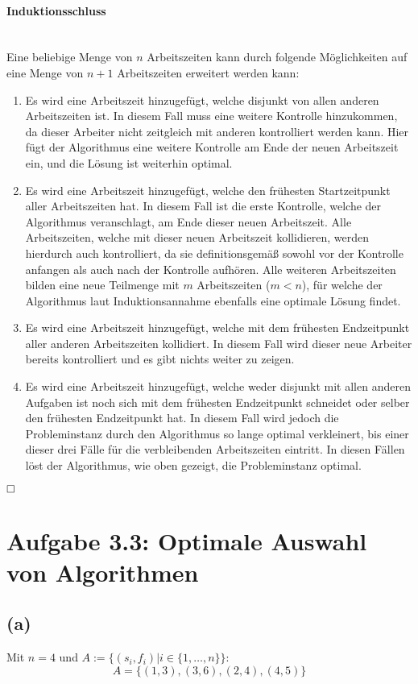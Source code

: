 \documentclass[a4paper,12pt]{article}
\begin{document}
\paragraph*{Induktionsschluss} \mbox{}\\
Eine beliebige Menge von $n$ Arbeitszeiten kann durch folgende Möglichkeiten auf eine Menge von $n+1$ Arbeitszeiten erweitert werden kann: 
\begin{enumerate}
\item Es wird eine Arbeitszeit hinzugefügt, welche disjunkt von allen anderen Arbeitszeiten ist. In diesem Fall muss eine weitere Kontrolle hinzukommen, da dieser Arbeiter nicht zeitgleich mit anderen kontrolliert werden kann. Hier fügt der Algorithmus eine weitere Kontrolle am Ende der neuen Arbeitszeit ein, und die Lösung ist weiterhin optimal.
\item Es wird eine Arbeitszeit hinzugefügt, welche den frühesten Startzeitpunkt aller Arbeitszeiten hat. In diesem Fall ist die erste Kontrolle, welche der Algorithmus veranschlagt, am Ende dieser neuen Arbeitszeit. Alle Arbeitszeiten, welche mit dieser neuen Arbeitszeit kollidieren, werden hierdurch auch kontrolliert, da sie definitionsgemäß sowohl vor der Kontrolle anfangen als auch nach der Kontrolle aufhören. Alle weiteren Arbeitszeiten bilden eine neue Teilmenge mit $m$ Arbeitszeiten ($m<n$), für welche der Algorithmus laut Induktionsannahme ebenfalls eine optimale Lösung findet.
\item Es wird eine Arbeitszeit hinzugefügt, welche mit dem frühesten Endzeitpunkt aller anderen Arbeitszeiten kollidiert. In diesem Fall wird dieser neue Arbeiter bereits kontrolliert und es gibt nichts weiter zu zeigen.
\item Es wird eine Arbeitszeit hinzugefügt, welche weder disjunkt mit allen anderen Aufgaben ist noch sich mit dem frühesten Endzeitpunkt schneidet oder selber den frühesten Endzeitpunkt hat. In diesem Fall wird jedoch die Probleminstanz durch den Algorithmus so lange optimal verkleinert, bis einer dieser drei Fälle für die verbleibenden Arbeitszeiten eintritt. In diesen Fällen löst der Algorithmus, wie oben gezeigt, die Probleminstanz optimal.
\end{enumerate}
$\hfill\square$

\pagebreak
\section*{Aufgabe 3.3: Optimale Auswahl von Algorithmen}
\subsection*{(a)}
Mit $n=4$ und $A:=\{(s_i,f_i)|i\in\{1,\ldots,n\}\}$:
$$A=\{(1,3),(3,6),(2,4),(4,5)\}$$
\end{document}
